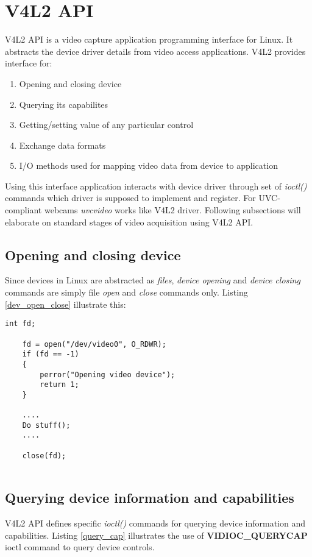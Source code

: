\documentclass{article}
\begin{document}
\section{V4L2 API}
V4L2 API is a video capture application programming interface for Linux. It abstracts the device driver details from video access applications. V4L2 provides interface for:
\begin{enumerate}
\item Opening and closing device
\item Querying its capabilites
\item Getting/setting value of any particular control
\item Exchange data formats
\item I/O methods used for mapping video data from device to application
\end{enumerate}

Using this interface application interacts with device driver through set of \textit{ioctl()} commands which driver is supposed to implement and register. For UVC-compliant webcams \textit{uvcvideo} works like V4L2 driver. Following subsections will elaborate on standard stages of video acquisition using V4L2 API.

\subsection{Opening and closing device}
Since devices in Linux are abstracted as \textit{files}, \textit{device opening} and \textit{device closing} commands are simply file \textit{open} and \textit{close} commands only. Listing \ref{dev_open_close} illustrate this:

\begin{lstlisting}[label=dev_open,caption=Opening a device]
int fd;

    fd = open("/dev/video0", O_RDWR);
    if (fd == -1)
    {
        perror("Opening video device");
        return 1;
    }

    ....
    Do stuff();
    ....

    close(fd); 
   
\end{lstlisting}


\subsection{Querying device information and capabilities}
V4L2 API defines specific \textit{ioctl()} commands for querying device information and capabilities. Listing \ref{query_cap} illustrates the use of \textbf{VIDIOC\_QUERYCAP} ioctl command to query device controls.
\end{document}
